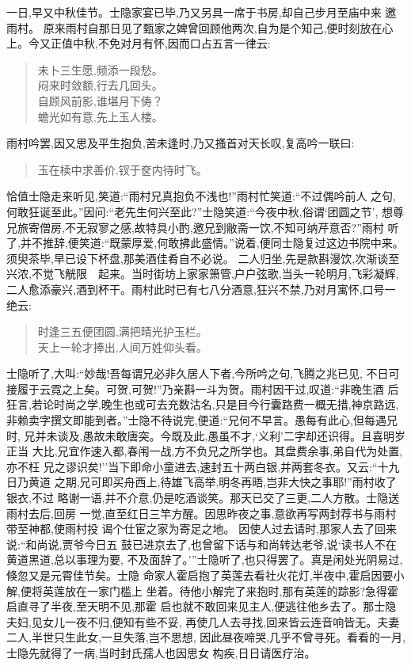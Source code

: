 \documentclass[nofonts]{ctexbook}
\newcommand*{\wei}{\CJKfamily{xinwei}}    %
\begin{document}
    一日,早又中秋佳节。士隐家宴已毕,乃又另具一席于书房,却自己步月至庙中来
邀雨村。 原来雨村自那日见了甄家之婢曾回顾他两次,自为是个知己,便时刻放在心
上。今又正值中秋,不免对月有怀,因而口占五言一律云:

\begin{verse} \wei
    未卜三生愿,频添一段愁。\\
    闷来时敛额,行去几回头。\\
    自顾风前影,谁堪月下俦？\\
    蟾光如有意,先上玉人楼。
\end{verse}

    雨村吟罢,因又思及平生抱负,苦未逢时,乃又搔首对天长叹,复高吟一联曰:

\begin{verse} \wei
    玉在椟中求善价,钗于奁内待时飞。
\end{verse}

    恰值士隐走来听见,笑道:``雨村兄真抱负不浅也!''雨村忙笑道:``不过偶吟前人
之句,何敢狂诞至此。''因问:``老先生何兴至此?''士隐笑道:``今夜中秋,俗谓`团圆之节',
想尊兄旅寄僧房,不无寂寥之感,故特具小酌,邀兄到敝斋一饮,不知可纳芹意否?''雨村
听了,并不推辞,便笑道:``既蒙厚爱,何敢拂此盛情。''说着,便同士隐复过这边书院中来。
须臾茶毕,早已设下杯盘,那美酒佳肴自不必说。 二人归坐,先是款斟漫饮,次渐谈至
兴浓,不觉飞觥限　起来。当时街坊上家家箫管,户户弦歌,当头一轮明月,飞彩凝辉,
二人愈添豪兴,酒到杯干。雨村此时已有七八分酒意,狂兴不禁,乃对月寓怀,口号一绝云:

\begin{verse} \wei
    时逢三五便团圆,满把晴光护玉栏。\\
    天上一轮才捧出,人间万姓仰头看。
\end{verse}

    士隐听了,大叫:``妙哉!吾每谓兄必非久居人下者,今所吟之句,飞腾之兆已见,
不日可接履于云霓之上矣。可贺,可贺!''乃亲斟一斗为贺。雨村因干过,叹道:``非晚生酒
后狂言,若论时尚之学,晚生也或可去充数沽名,只是目今行囊路费一概无措,神京路远,
非赖卖字撰文即能到者。''士隐不待说完,便道:``兄何不早言。愚每有此心,但每遇兄时,
兄并未谈及,愚故未敢唐突。今既及此,愚虽不才,`义利'二字却还识得。且喜明岁正当
大比,兄宜作速入都,春闱一战,方不负兄之所学也。其盘费余事,弟自代为处置,亦不枉
兄之谬识矣!''当下即命小童进去,速封五十两白银,并两套冬衣。又云:``十九日乃黄道
之期,兄可即买舟西上,待雄飞高举,明冬再晤,岂非大快之事耶!''雨村收了银衣,不过
略谢一语,并不介意,仍是吃酒谈笑。那天已交了三更,二人方散。士隐送雨村去后,回房
一觉,直至红日三竿方醒。因思昨夜之事,意欲再写两封荐书与雨村带至神都,使雨村投
谒个仕宦之家为寄足之地。 因使人过去请时,那家人去了回来说:``和尚说,贾爷今日五
鼓已进京去了,也曾留下话与和尚转达老爷,说`读书人不在黄道黑道,总以事理为要,
不及面辞了。'''士隐听了,也只得罢了。真是闲处光阴易过,倏忽又是元霄佳节矣。士隐
命家人霍启抱了英莲去看社火花灯,半夜中,霍启因要小解,便将英莲放在一家门槛上
坐着。待他小解完了来抱时,那有英莲的踪影?急得霍启直寻了半夜,至天明不见,那霍
启也就不敢回来见主人,便逃往他乡去了。那士隐夫妇,见女儿一夜不归,便知有些不妥,
再使几人去寻找,回来皆云连音响皆无。夫妻二人,半世只生此女,一旦失落,岂不思想,
因此昼夜啼哭,几乎不曾寻死。看看的一月,士隐先就得了一病,当时封氏孺人也因思女
构疾,日日请医疗治。
\end{document}
